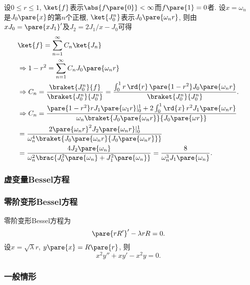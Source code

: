 \documentclass[hidelinks]{ctexart}
\begin{document}
\begin{sample}
    \begin{ex}
        设$0\le r\le 1$, $\ket{f}$表示$\abs{f\pare{0}} < \infty$而$f\pare{1} = 0$者. 设$x = \omega_n$是$J_0\pare{x}$的第$n$个正根, $\ket{J_0^n}$表示$J_0\pare{\omega_n r}$, 则由$xJ_0 = \pare{xJ_1}'$及$J_2 = 2J_1/x - J_0$可得
        \begin{align*}
            & \ket{f} = \sum_{n=1}^\infty C_n \ket{J_n} \\
            & \Rightarrow 1-r^2 = \sum_{n=1}^\infty C_n J_0\pare{\omega_n r} \\
            & \Rightarrow C_n = \frac{\braket{J_0^n}{f}}{\braket{J_0^n}{J_0^n}} = \frac{\int_0^1r\,\rd{r}\,\pare{1-r^2}J_0\pare{\omega_n r}}{\braket{J_0^n}{J_0^n}}. \\
            &\Rightarrow  C_n = \frac{\pare{1-r^2}rJ_1\pare{\omega_1 r}\vert_0^1 + 2\int_0^1\rd{x}\,r^2 J_1\pare{\omega_n r}}{\omega_n \braket{J_0\pare{\omega_n r}}{J_0\pare{\omega r}}} \\
            & =  \frac{2\pare{\omega_n r}^2J_2\pare{\omega_n r}\vert_0^1}{\omega_n^4 \braket{J_0\pare{\omega_n r}{J_0\pare{\omega_n r}}}}\\
            & = \frac{4J_2\pare{\omega_n}}{\omega_n^2\brac{J_0^2\pare{\omega_n}+J_1^2\pare{\omega_n}}} = \frac{8}{\omega_n^3 J_1\pare{\omega_n}}.
        \end{align*}
    \end{ex}
\end{sample}


\subsubsection{虚变量Bessel方程} %
\label{ssub:虚变量bessel方程}

\subsubsection{零阶变形Bessel方程} %
\label{ssub:零阶变形bessel方程}

零阶变形Bessel方程为
\[ \pare{rR'}' - \lambda rR = 0. \]
设$x = \sqrt{\lambda}r$, $y\pare{x} = R\pare{r}$, 则
\[ x^2y'' + xy' - x^2y = 0. \]


\subsubsection{一般情形} %
\label{ssub:一般情形}
\end{document}
